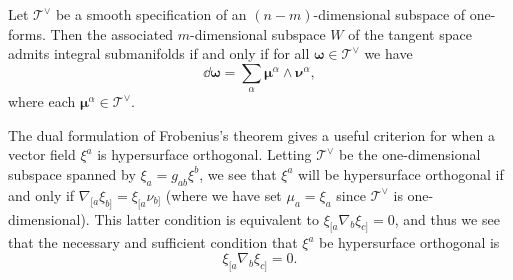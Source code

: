 \begin{theorem}\label{thm:B.3.2}
Let \(\mathcal T^\vee\) be a smooth specification of an \((n-m)\)-dimensional subspace
of one-forms. Then the associated \(m\)-dimensional subspace \(W\) of the tangent
space admits integral submanifolds if and only if for all
\(\boldsymbol\omega\in\mathcal T^\vee\) we have
\[
  \dd\boldsymbol\omega
  =\sum_\alpha\boldsymbol\mu^\alpha\wedge\boldsymbol\nu^\alpha,
\]
where each \(\boldsymbol\mu^\alpha\in\mathcal T^\vee\).
\end{theorem}

The dual formulation of Frobenius's theorem gives a useful criterion for when a
vector field \(\xi^a\) is hypersurface orthogonal. Letting \(\mathcal T^\vee\) be the
one-dimensional subspace spanned by \(\xi_a=g_{ab}\xi^b\), we see that \(\xi^a\)
will be hypersurface orthogonal if and only if
\(\nabla_{[a}\xi_{b]}=\xi_{[a}\nu_{b]}\) (where we have set
\(\mu_a=\xi_a\) since \(\mathcal T^\vee\) is one-dimensional). This latter condition is
equivalent to \(\xi_{[a}\nabla_b\xi_{c]}=0\), and thus we see that the necessary and
sufficient condition that \(\xi^a\) be hypersurface orthogonal is
\begin{equation}
  \xi_{[a}\nabla_b\xi_{c]}=0.
  \tag{B.3.6}\label{eq:B.3.6}
\end{equation}
